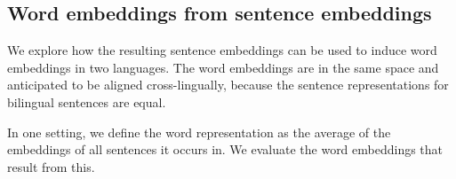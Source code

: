 \subsection{Word embeddings from sentence embeddings}
We explore how the resulting sentence embeddings can be used to induce word embeddings in two languages. The word embeddings are in the same space and anticipated to be aligned cross-lingually, because the sentence representations for bilingual sentences are equal.

In one setting, we define the word representation as the average of the embeddings of all sentences it occurs in. We evaluate the word embeddings that result from this.




